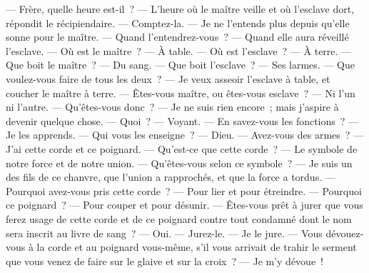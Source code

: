 \documentclass[11pt,twoside,openany]{book}
\newenvironment{lateiDocument}{}{}
\begin{document}
\begin{lateiDocument}
\begin{teiElement}[name={TEI},change={commons\_edition}]
\begin{teiElement}[name={text},type={book},xmlid={book}]
\begin{teiElement}[name={group},type={book},xmlid={book-001}]
\begin{teiElement}[name={group},type={section1},xmlid={section1-001}]
\begin{teiElement}
\begin{teiElement}[name={body},xmlid={body-003}]
\begin{teiDiv}[type={section1},xmlid={div01-2}]
\begin{teiCit}[xmlid={cit04-2}]
                \begin{teiQuote}
— Frère, quelle heure est-il ? — L’heure où le maître veille et où l’esclave dort, répondit le récipiendaire. — Comptez-la. — Je ne l’entends plus depuis qu’elle sonne pour le maître. — Quand l’entendrez-vous ? — Quand elle aura réveillé l’esclave. — Où est le maître ? — À table. — Où est l’esclave ? — À terre. — Que boit le maître ? — Du sang. — Que boit l’esclave ? — Ses larmes. — Que voulez-vous faire de tous les deux ? — Je veux asseoir l’esclave à table, et coucher le maître à terre. — Êtes-vous maître, ou êtes-vous esclave ? — Ni l’un ni l’autre. — Qu’êtes-vous donc ? — Je ne suis rien encore ; mais j’aspire à devenir quelque chose. — Quoi ? — Voyant. — En savez-vous les fonctions ? — Je les apprends. — Qui vous les enseigne ? — Dieu. — Avez-vous des armes ? — J’ai cette corde et ce poignard. — Qu’est-ce que cette corde ? — Le symbole de notre force et de notre union. — Qu’êtes-vous selon ce symbole ? — Je suis un des fils de ce chanvre, que l’union a rapprochés, et que la force a tordus. — Pourquoi avez-vous pris cette corde ? — Pour lier et pour étreindre. — Pourquoi ce poignard ? — Pour couper et pour désunir. — Êtes-vous prêt à jurer que vous ferez usage de cette corde et de ce poignard contre tout condamné dont le nom sera inscrit au livre de sang ? — Oui. — Jurez-le. — Je le jure. — Vous dévouez-vous à la corde et au poignard vous-même, s’il vous arrivait de trahir le serment que vous venez de faire sur le glaive et sur la croix ? — Je m’y dévoue !
\end{teiQuote}
              

\end{teiCit}
\end{teiDiv}
\end{teiElement}
\end{teiElement}
\end{teiElement}
\end{teiElement}
\end{teiElement}
\end{teiElement}
\end{lateiDocument}
\end{document}
